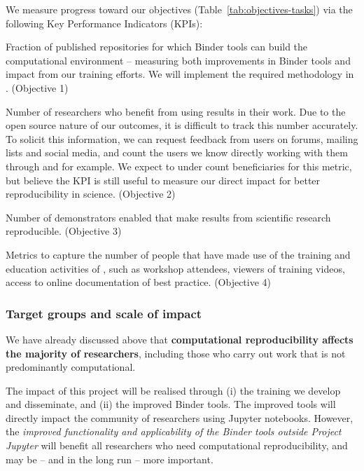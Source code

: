 We measure progress toward our objectives (Table~\ref{tab:objectives-tasks})
via the following Key Performance Indicators (KPIs):
\begin{compactenum}
\item \label{kpi:reproducibility} Fraction of published repositories for
  which Binder tools can build the computational environment -- measuring both
  improvements in Binder tools and impact from our training efforts. We will
  implement the required methodology in
  . (Objective 1)
\item \label{kpi:broaden} Number of researchers who benefit from using
  \TheProject{} results in their work. Due to the open source nature of our
  outcomes, it is difficult to track this number accurately. To solicit this
  information, we can request feedback from users on forums, mailing lists and
  social media, and count the users we know directly working with
  them through  and  for example. We expect
  to under count beneficiaries for this metric, but believe the KPI is still useful
  to measure our direct impact for better reproducibility in science. (Objective 2)
\item \label{kpi:demonstrators} Number of demonstrators enabled that make
  results from scientific research reproducible. (Objective 3)
\item \label{kpi:education} Metrics to capture the number of people that have
  made use of the training and education activities of \TheProject{}, such as
  workshop attendees, viewers of training videos, access to online documentation
  of best practice. (Objective 4)%
\end{compactenum}


\subsubsection{Target groups and scale of impact}\label{sec:target-groups-and-scale-of-impact}

We have already discussed above that \textbf{computational reproducibility affects the
majority of researchers}, including those who carry out work that is not
predominantly computational.

The impact of this project will be realised through (i) the training we develop
and disseminate, and (ii) the improved Binder tools. The improved tools will
directly impact the community of researchers using Jupyter notebooks. However,
the \emph{improved functionality and applicability of the Binder tools outside Project
Jupyter} will benefit all researchers who need computational reproducibility, and
may be -- and in the long run -- more important.

